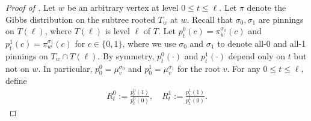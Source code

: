 \documentclass[11pt,a4paper]{amsart}
\newcommand{\defeq}{:=}
\theoremstyle{definition}
\theoremstyle{remark}
\begin{document}
\begin{proof}[Proof of ]
Let $w$ be an arbitrary vertex at level $0 \leq t \leq \ell$. 
Let $\pi$ denote the Gibbs distribution on the subtree rooted $T_w$ at $w$.
Recall that $\sigma_0,\sigma_1$ are pinnings on $T(\ell)$, where $T(\ell)$ is level $\ell$ of $T$.
Let $p^0_t(c) = \pi^{\sigma_0}_w(c)$ and $p^1_t(c) = \pi^{\sigma_1}_w(c)$ for $c \in \{0,1\}$, where we use $\sigma_{0}$ and $\sigma_1$ to denote all-0 and all-1 pinnings on $T_w \cap T(\ell)$.  By symmetry, $p^0_t(\cdot)$ and $p^1_t(\cdot)$ depend only on $t$ but not on $w$. In particular, $p^0_0 = \mu_v^{\sigma_0}$ and $p^1_0 = \mu_v^{\sigma_1}$ for the root $v$. For any $0 \leq t \leq \ell$, define
\begin{align*}
	R^0_t \defeq \frac{p^0_t(1)}{p^0_t(0)}, \quad R^1_t \defeq \frac{p^1_t(1)}{p^1_t(0)}.
\end{align*}


\end{proof}
\end{document}
